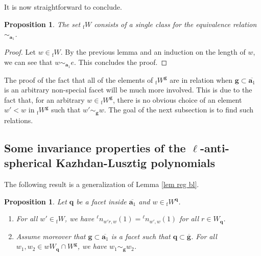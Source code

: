 \documentclass[11pt]{amsart}
\theoremstyle{plain}
\newtheorem{prop}[thm]{Proposition}
\theoremstyle{remark}
\numberwithin{equation}{section}
\begin{document}
	It is now straightforward to conclude.
	\begin{prop}\label{prop block sing}
		The set ${_\mathrm{f}W}$ consists of a single class for the equivalence relation $\sim_{\mathbf{a}_1}$.
	\end{prop}
	\begin{proof}
		Let $w\in {_{\mathrm{f}}W}$. By the previous lemma and an induction on the length of $w$, we can see that $w\sim_{\mathbf{a}_1}e$. This concludes the proof.
	\end{proof}
	The proof of the fact that all of the elements of ${_{\mathrm{f}}W}^\mathbf{g}$ are in relation when $\mathbf{g}\subset\overline{\mathbf{a}_1}$ is an arbitrary non-special facet will be much more involved. This is due to the fact that, for an arbitrary $w\in {_{\mathrm{f}}W}^\mathbf{g}$, there is no obvious choice of an element $w'<w$ in ${_{\mathrm{f}}W}^\mathbf{g}$ such that $w'\sim_{\mathbf{{g}}}w$. The goal of the next subsection is to find such relations.
	\subsection{Some invariance properties of the $\ell$-anti-spherical Kazhdan-Lusztig polynomials}
	The following result is a generalization of Lemma \ref{lem reg bl}. 
	\begin{prop}\label{prop max coset}
		Let $\mathbf{q}$ be a facet inside $\overline{\mathbf{a}_1}$ and $w\in {_{\mathrm{f}}W}^\mathbf{q}$. \begin{enumerate}
			\item For all $w'\in {_\mathrm{f}W}$, we have ${^\ell n}_{w'r,w}(1)={^\ell n}_{w',w}(1)$ for all $r \in W_\mathbf{q}$.
			\item Assume moreover that $\mathbf{g}\subset \overline{\mathbf{a}_1}$ is a facet such that $\mathbf{q}\subset\overline{\mathbf{g}}$. For all $w_1,w_2\in wW_\mathbf{q}\cap W^{\mathbf{g}}$, we have $w_1\sim_{\mathbf{{g}}}w_2$.
		\end{enumerate} 
	\end{prop}
	
\end{document}
